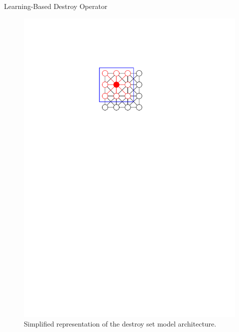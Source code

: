 \documentclass[aspectratio=1610]{beamer}
\begin{document}
\begin{frame}{Learning-Based Destroy Operator}
\begin{figure}
\begin{overprint}
{}
    	\centering \includegraphics[width=\linewidth, page=3]{figures/graphics.pdf}
    	\end{overprint}
    	\caption{Simplified representation of the destroy set model architecture.}
    \end{figure}
\end{frame}
\end{document}
